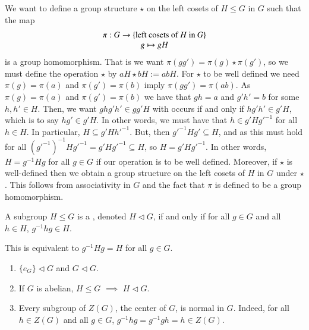 \documentclass[12pt, a4paper, oneside, openright, titlepage]{book}
\begin{document}
\begin{cons}
        We want to define a group structure $\star$ on the left cosets of $H \leq G$ in $G$ such that the map \begin{equation}
                \begin{array}{c} \pi:G\rightarrow \{\text{left cosets of $H$ in $G$}\} \\ g\mapsto gH \end{array}
        \end{equation}
        is a group homomorphism. That is we want $\pi(gg') = \pi(g) \star \pi(g')$, so we must define the operation $\star$ by $aH\star bH := abH$. For $\star$ to be well defined we need $\pi(g) = \pi(a)$ and $\pi(g') = \pi(b)$ imply $\pi(gg') = \pi(ab)$. As $\pi(g) = \pi(a)$ and $\pi(g') = \pi(b)$ we have that $gh = a$ and $g'h' = b$ for some $h,h' \in H$. Then, we want $ghg'h' \in gg'H$ with occurs if and only if $hg'h' \in g'H$, which is to say $hg' \in g'H$. In other words, we must have that $h \in g'H{g'}^{-1}$ for all $h \in H$. In particular, $H \subseteq g'H{h'}^{-1}$. But, then ${g'}^{-1}Hg' \subseteq H$, and as this must hold for all $({g'}^{-1})^{-1}H{g'}^{-1} = g'H{g'}^{-1} \subseteq H$, so $H = g'H{g'}^{-1}$. In other words, $H = g^{-1}Hg$ for all $g \in G$ if our operation is to be well defined. Moreover, if $\star$ is well-defined then we obtain a group structure on the left cosets of $H$ in $G$ under $\star$. This follows from associativity in $G$ and the fact that $\pi$ is defined to be a group homomorphism.
\end{cons}

\begin{defn}
        A subgroup $H \leq G$ is a , denoted $H \vartriangleleft G$, if and only if for all $g \in G$ and all $h \in H$, $g^{-1}hg \in H$.
\end{defn}

\begin{note}
        This is equivalent to $g^{-1}Hg = H$ for all $g \in G$.
\end{note}

\begin{eg}
        \leavevmode
        \begin{enumerate}
                \item $\{e_G\}\vartriangleleft G$ and $G \vartriangleleft G$.
                \item If $G$ is abelian, $H \leq G$ $\implies$ $H \vartriangleleft G$.
                \item Every subgroup of $Z(G)$, the center of $G$, is normal in $G$. Indeed, for all $h \in Z(G)$ and all $g \in G$, $g^{-1}hg = g^{-1}gh = h \in Z(G)$.
        \end{enumerate}
\end{eg}
\end{document}
